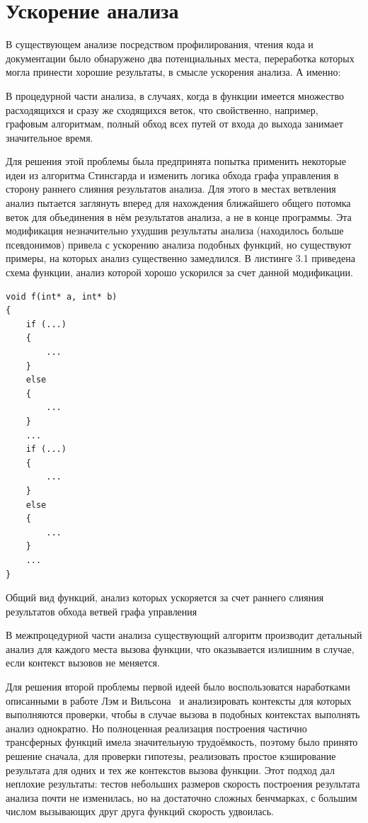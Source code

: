 \section{Ускорение анализа}

В существующем анализе посредством профилирования, чтения кода и документации было обнаружено два потенциальных места, переработка которых могла принести хорошие результаты, в смысле ускорения анализа. А именно:

В процедурной части анализа, в случаях, когда в функции имеется множество расходящихся и сразу же сходящихся веток, что свойственно, например, графовым алгоритмам, полный обход всех путей от входа до выхода занимает значительное время.

Для решения этой проблемы была предпринята попытка применить некоторые идеи из алгоритма Стинсгарда и изменить логика обхода графа управления в сторону раннего слияния результатов анализа. Для этого в местах ветвления анализ пытается заглянуть вперед для нахождения ближайшего общего потомка веток для объединения в нём результатов анализа, а не в конце программы. Эта модификация незначительно ухудшив результаты анализа (находилось больше псевдонимов) привела с ускорению анализа подобных функций, но существуют примеры, на которых анализ существенно замедлился. В листинге 3.1 приведена схема функции, анализ которой хорошо ускорился за счет данной модификации.

\begin{ListingEnv}[H]
\begin{lstlisting}
void f(int* a, int* b)
{
    if (...)
    {
        ...
    }
    else
    {
        ...
    }
    ...
    if (...)
    {
        ...
    }
    else
    {
        ...
    }
    ...
}
\end{lstlisting}
\caption{Общий вид функций, анализ которых ускоряется за счет раннего слияния результатов обхода ветвей графа управления}
\label{list:otherlevels}
\end{ListingEnv}

В межпроцедурной части анализа существующий алгоритм производит детальный анализ для каждого места вызова функции, что оказывается излишним в случае, если контекст вызовов не меняется.

Для решения второй проблемы первой идеей было воспользоватся наработками описанными в работе Лэм и Вильсона~\autocite{WilsonLamSIGPLAN95} и анализировать контексты для которых выполняются проверки, чтобы в случае вызова в подобных контекстах выполнять анализ однократно. Но полноценная реализация построения частично трансферных функций имела значительную трудоёмкость, поэтому было принято решение сначала, для проверки гипотезы, реализовать простое кэширование результата для одних и тех же контекстов вызова функции. Этот подход дал неплохие результаты: тестов небольших размеров скорость построения результата анализа почти не изменилась, но на достаточно сложных бенчмарках, с большим числом вызывающих друг друга функций скорость удвоилась.

